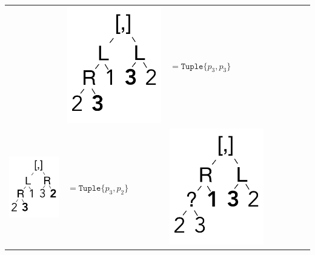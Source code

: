 \documentclass[a4paper,english]{lipics-v2019}
\newcommand{\xt}[1]{\texttt{#1}}
\newcommand{\tuple}[1]{\xt{Tuple\{}#1\xt{\}}}
\begin{document}
{\begin{tabular}{@{}l@{~}ll@{~}ll@{~}ll@{~}l}
&\begin{minipage}{1.2cm}\includegraphics[scale=.25]{figures/tree4.pdf} 
\end{minipage} &  $ =   \tuple{p_3,p_3} $ \\
\begin{minipage}{1.2cm}\includegraphics[scale=.25]{figures/tree5.pdf} 
\end{minipage} &  $ =   \tuple{p_3,p_2} $  &
\begin{minipage}{1.2cm}\includegraphics[scale=.25]{figures/tree6.pdf} 

\end{minipage}
\end{tabular}}
\end{document}
